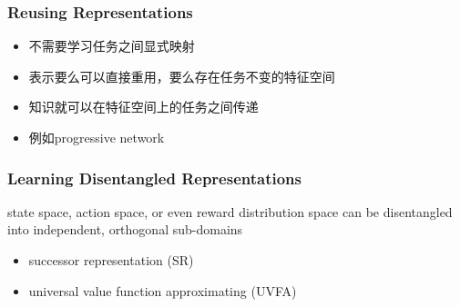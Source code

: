 \documentclass[aspectratio=169]{beamer}
\begin{document}
\begin{frame}
  \frametitle{Reusing Representations}
  \begin{itemize}
    \item 不需要学习任务之间显式映射
    \item 表示要么可以直接重用，要么存在任务不变的特征空间
    \item 知识就可以在特征空间上的任务之间传递
    \item 例如progressive network
  \end{itemize}
\end{frame}

\begin{frame}
  \frametitle{Learning Disentangled Representations}
  state space, action space, or even reward distribution space can be disentangled into independent, orthogonal sub-domains
  \begin{itemize}
    \item successor representation (SR)
    \item universal value function approximating (UVFA)
  \end{itemize}
\end{frame}
\end{document}
